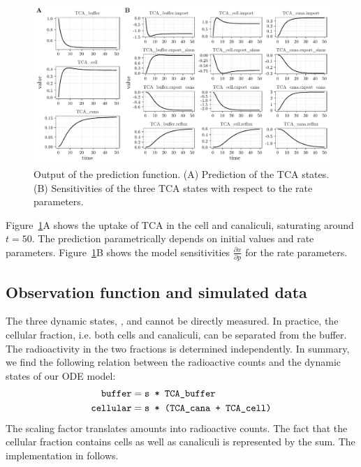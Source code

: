 \documentclass[article]{jss}
\begin{document}
\begin{figure}[ht]
	\includegraphics[width = \textwidth]{images/figure1}
	\caption{Output of the prediction function. (A) Prediction of the TCA states. (B) Sensitivities of the three TCA states with respect to the rate parameters.}
	\label{fig:prediction}
\end{figure}

Figure~\ref{fig:prediction}A shows the uptake of TCA in the cell and canaliculi, saturating around $t = 50$. The prediction parametrically depends on initial values and rate parameters. Figure~\ref{fig:prediction}B shows the model sensitivities $\frac{\partial x}{\partial p}$ for the rate parameters.

\subsection{Observation function and simulated data}
The three dynamic states, ,  and  cannot be directly measured. In practice, the cellular fraction, i.e. both cells and canaliculi, can be separated from the buffer. The radioactivity in the two fractions is determined independently. In summary, we find the following relation between the radioactive counts and the dynamic states of our ODE model:
\begin{equation}
	\begin{aligned}
		\verb!buffer! &= \verb!s * TCA_buffer!\\
		\verb!cellular! &= \verb!s * (TCA_cana + TCA_cell)!
	\end{aligned}
	\label{}
\end{equation}
The scaling factor  translates amounts into radioactive counts. The fact that the cellular fraction contains cells as well as canaliculi is represented by the sum. The implementation in  follows.
\end{document}
